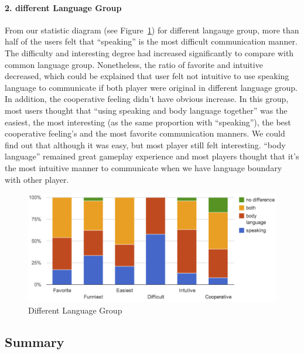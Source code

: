\paragraph{2. different Language Group}
From our statistic diagram (see Figure~\ref{fig:US_FQ_Dif}) for different langauge group, more than half of the users felt that ``speaking'' is the most difficult communication manner. The difficulty and interesting degree had increased significantly to compare with common language group. Nonetheless, the ratio of favorite and intuitive decreased, which could be explained that user felt not intuitive to use speaking language to communicate if both player were original in different language group. In addition, the cooperative feeling didn't have obvious increase. In this group, most users thought that ``using speaking and body language together'' was the easiest, the most interesting (as the same proportion with ``speaking''), the best cooperative feeling's and the most favorite communication manners. We could find out that although it was easy, but most player still felt interesting. ``body language'' remained great gameplay experience and most players thought that it's the most intuitive manner to communicate when we have language boundary with other player.

\begin{figure}[!h]
\centering
\includegraphics[width=0.9\columnwidth]{Figures/US_FQ_Dif.png}
\caption{Different Language Group}
\label{fig:US_FQ_Dif}
\end{figure}


\subsection{Summary}


